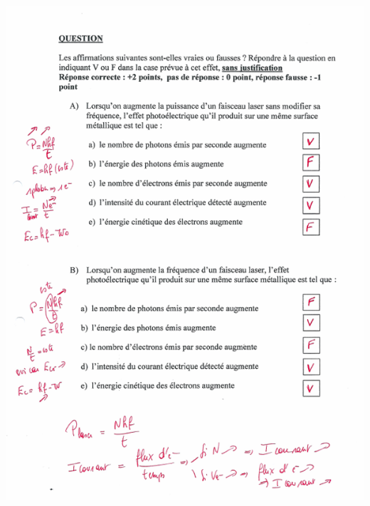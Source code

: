 {\includegraphics[width=17.498cm,height=24.13cm]{Pictures/10000001000002570000033B70807DBABEAE0DEC.png}

}
